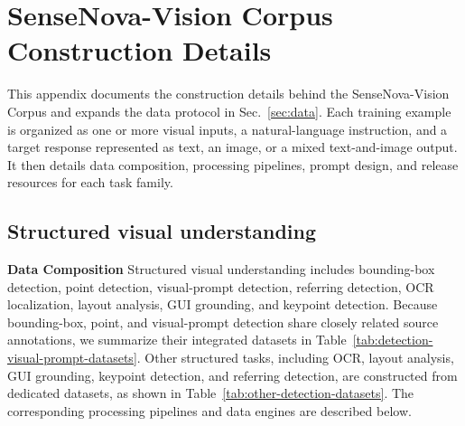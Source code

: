 \lstset{
    basicstyle=\ttfamily\footnotesize,
    frame=single,
    float=htbp,
    breaklines=true,
    sensitive=false, 
    tabsize=2,
    lineskip=-2pt,    
    aboveskip=2pt,    
    belowskip=2pt,    
    xleftmargin=4pt   
}
\renewcommand{\topfraction}{0.95}
\renewcommand{\bottomfraction}{0.9}
\renewcommand{\textfraction}{0.05}
\renewcommand{\floatpagefraction}{0.85}
\setcounter{topnumber}{5}
\setcounter{bottomnumber}{3}
\setcounter{totalnumber}{8}
\setlength{\abovecaptionskip}{4pt}
\setlength{\belowcaptionskip}{2pt}
\captionsetup[table]{skip=4pt}
\section{SenseNova-Vision Corpus Construction Details}
\label{app:data_protocol_construction}

This appendix documents the construction details behind the SenseNova-Vision Corpus and expands the data protocol in Sec.~\ref{sec:data}.
Each training example is organized as one or more visual inputs, a natural-language instruction, and a target response represented as text, an image, or a mixed text-and-image output.
It then details data composition, processing pipelines, prompt design, and release resources for each task family.



\subsection{Structured visual understanding}
\textbf{Data Composition}
Structured visual understanding includes bounding-box detection, point detection, visual-prompt detection, referring detection, OCR localization, layout analysis, GUI grounding, and keypoint detection.
Because bounding-box, point, and visual-prompt detection share closely related source annotations, we summarize their integrated datasets in Table~\ref{tab:detection-visual-prompt-datasets}.
Other structured tasks, including OCR, layout analysis, GUI grounding, keypoint detection, and referring detection, are constructed from dedicated datasets, as shown in Table~\ref{tab:other-detection-datasets}.
The corresponding processing pipelines and data engines are described below.

